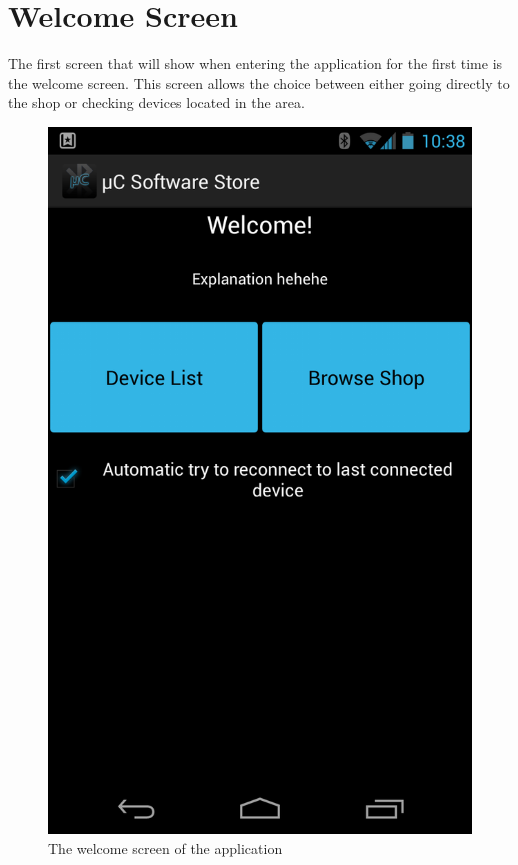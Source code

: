 \chapter{Welcome Screen}
The first screen that will show when entering the application for the first time is the welcome screen. This screen allows the choice between either going directly to the shop or checking devices located in the area. \\
\newline
\begin{figure}[H]
	\centering
	\includegraphics[scale = 0.3]{images/Screenshots/welcome_screen.png}
	\caption{The welcome screen of the application}
\end{figure}


